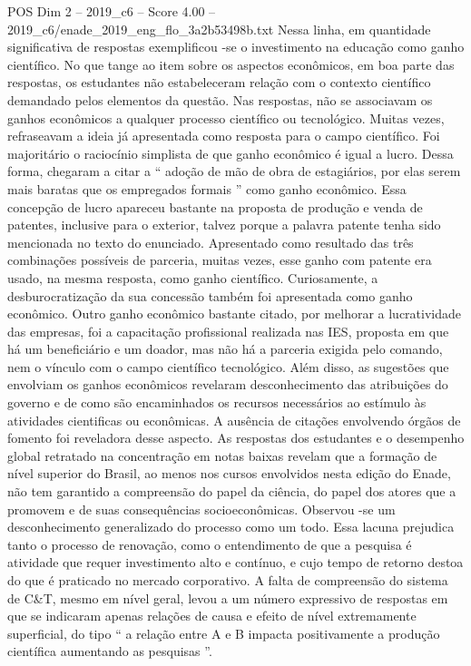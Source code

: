 \begin{textsample}{POS Dim 2 – 2019\_c6 – Score 4.00 – 2019\_c6/enade\_2019\_eng\_flo\_3a2b53498b.txt}
Nessa linha, em quantidade significativa de respostas exemplificou -se o investimento na educação como ganho científico.
No que tange ao item sobre os aspectos econômicos, em boa parte das respostas, os estudantes não estabeleceram relação com o contexto científico demandado pelos elementos da questão.
Nas respostas, não se associavam os ganhos econômicos a qualquer processo científico ou tecnológico.
Muitas vezes, refraseavam a ideia já apresentada como resposta para o campo científico.
Foi majoritário o raciocínio simplista de que ganho econômico é igual a lucro.
Dessa forma, chegaram a citar a “ adoção de mão de obra de estagiários, por elas serem mais baratas que os empregados formais ” como ganho econômico.
Essa concepção de lucro apareceu bastante na proposta de produção e venda de patentes, inclusive para o exterior, talvez porque a palavra patente tenha sido mencionada no texto do enunciado.
Apresentado como resultado das três combinações possíveis de parceria, muitas vezes, esse ganho com patente era usado, na mesma resposta, como ganho científico.
Curiosamente, a desburocratização da sua concessão também foi apresentada como ganho econômico.
Outro ganho econômico bastante citado, por melhorar a lucratividade das empresas, foi a capacitação profissional realizada nas IES, proposta em que há um beneficiário e um doador, mas não há a parceria exigida pelo comando, nem o vínculo com o campo científico tecnológico.
Além disso, as sugestões que envolviam os ganhos econômicos revelaram desconhecimento das atribuições do governo e de como são encaminhados os recursos necessários ao estímulo às atividades cientificas ou econômicas.
A ausência de citações envolvendo órgãos de fomento foi reveladora desse aspecto.
As respostas dos estudantes e o desempenho global retratado na concentração em notas baixas revelam que a formação de nível superior do Brasil, ao menos nos cursos envolvidos nesta edição do Enade, não tem garantido a compreensão do papel da ciência, do papel dos atores que a promovem e de suas consequências socioeconômicas.
Observou -se um desconhecimento generalizado do processo como um todo.
Essa lacuna prejudica tanto o processo de renovação, como o entendimento de que a pesquisa é atividade que requer investimento alto e contínuo, e cujo tempo de retorno destoa do que é praticado no mercado corporativo.
A falta de compreensão do sistema de C\&T, mesmo em nível geral, levou a um número expressivo de respostas em que se indicaram apenas relações de causa e efeito de nível extremamente superficial, do tipo “ a relação entre A e B impacta positivamente a produção científica aumentando as pesquisas ”.

\end{textsample}
